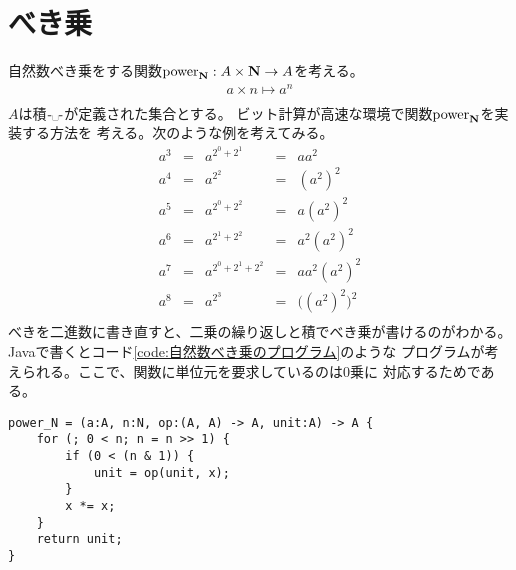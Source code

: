 \section{べき乗}\label{s1:自然数のべき乗} %
	自然数べき乗をする関数$\operatorname{power}_{\mathbf{N}}:A\times{\mathbf{N}}\to A$を考える。
	\begin{equation*}\begin{split} %
		a\times n \mapsto a^n \\
	\end{split}\end{equation*} %
	$A$は積$\mybiop{\myspace}$が定義された集合とする。
	ビット計算が高速な環境で関数$\operatorname{power}_{\mathbf{N}}$を実装する方法を
	考える。次のような例を考えてみる。
	\begin{equation*}\begin{matrix} %
		a^3 &=& a^{2^0+2^1} &=& aa^2 \\
		a^4 &=& a^{2^2} &=& (a^2)^2 \\
		a^5 &=& a^{2^0+2^2} &=& a(a^2)^2 \\
		a^6 &=& a^{2^1+2^2} &=& a^2(a^2)^2 \\
		a^7 &=& a^{2^0+2^1+2^2} &=& aa^2(a^2)^2 \\
		a^8 &=& a^{2^3} &=& \bigl((a^2)^2\bigr)^2 \\
	\end{matrix}\end{equation*} %
	べきを二進数に書き直すと、二乗の繰り返しと積でべき乗が書けるのがわかる。
	Javaで書くとコード\ref{code:自然数べき乗のプログラム}のような
	プログラムが考えられる。ここで、関数に単位元を要求しているのは$0$乗に
	対応するためである。

	\begin{lstlisting}[caption=自然数べき乗のプログラム, label=code:自然数べき乗のプログラム]
power_N = (a:A, n:N, op:(A, A) -> A, unit:A) -> A {
	for (; 0 < n; n = n >> 1) {
		if (0 < (n & 1)) {
			unit = op(unit, x);
		}
		x *= x;
	}
	return unit;
}
	\end{lstlisting}

